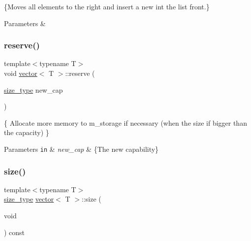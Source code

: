 \{Moves all elements to the right and insert a new int the list front.\} 


\begin{DoxyParams}{Parameters}
{\em } & \\
\hline
\end{DoxyParams}
\mbox{\label{classvector_a18b85e038e6237174c9bd76ffd034d66}} 
\subsubsection{\texorpdfstring{reserve()}{reserve()}}
{\footnotesize\ttfamily template$<$typename T$>$ \\
void \hyperlink{classvector}{vector}$<$ T $>$\+::reserve (\begin{DoxyParamCaption}\item[{\hyperlink{classvector_a4d06f3ade0c2ac023b7a7edb85d9d1ef}{size\+\_\+type}}]{new\+\_\+cap }\end{DoxyParamCaption})\hspace{0.3cm}{\ttfamily [inline]}}



\{ Allocate more memory to m\+\_\+storage if necessary (when the size if bigger than the capacity) \} 


\begin{DoxyParams}[1]{Parameters}
\mbox{\tt in}  & {\em new\+\_\+cap} & \{The new capability\} \\
\hline
\end{DoxyParams}
\mbox{\label{classvector_aff204421c89d6ba008c01bd2db9a5844}} 
\subsubsection{\texorpdfstring{size()}{size()}}
{\footnotesize\ttfamily template$<$typename T$>$ \\
\hyperlink{classvector_a4d06f3ade0c2ac023b7a7edb85d9d1ef}{size\+\_\+type} \hyperlink{classvector}{vector}$<$ T $>$\+::size (\begin{DoxyParamCaption}\item[{void}]{ }\end{DoxyParamCaption}) const\hspace{0.3cm}{\ttfamily [inline]}}



